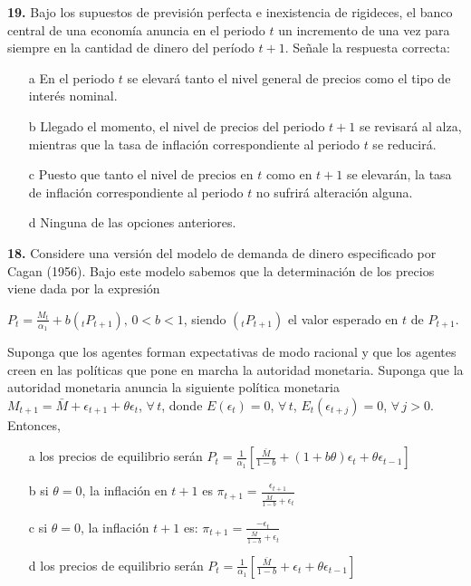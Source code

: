 \documentclass{nuevotema}
\begin{document}
\textbf{19.} Bajo los supuestos de previsión perfecta e inexistencia de rigideces, el banco central de una economía anuncia en el periodo $t$ un incremento de una vez para siempre en la cantidad de dinero del período $t+1$. Señale la respuesta correcta:

\begin{itemize}
	\item[a] En el periodo $t$ se elevará tanto el nivel general de precios como el tipo de interés nominal.
	\item[b] Llegado el momento, el nivel de precios del periodo $t+1$ se revisará al alza, mientras que la tasa de inflación correspondiente al periodo $t$ se reducirá.
	\item[c] Puesto que tanto el nivel de precios en $t$ como en $t+1$ se elevarán, la tasa de inflación correspondiente al periodo $t$ no sufrirá alteración alguna. 
	\item[d] Ninguna de las opciones anteriores.
\end{itemize}


\textbf{18.} Considere una versión del modelo de demanda de dinero especificado por Cagan (1956). Bajo este modelo sabemos que la determinación de los precios viene dada por la expresión

$P_t = \frac{M_t}{\alpha_1} + b( _t P_{t+1} ), \, 0 < b < 1$, siendo $(_t P_{t+1})$ el valor esperado en $t$ de $P_{t+1}$.

Suponga que los agentes forman expectativas de modo racional y que los agentes creen en las políticas que pone en marcha la autoridad monetaria. Suponga que la autoridad monetaria anuncia la siguiente política monetaria $M_{t+1} = \bar{M} + \epsilon_{t+1} + \theta \epsilon_t$, $\forall \, t$, donde $E(\epsilon_t)=0$, $\forall \, t$, $E_t(\epsilon_{t+j}) = 0$, $\forall \, j > 0$. Entonces,

\begin{itemize}
	\item[a] los precios de equilibrio serán $P_t = \frac{1}{\alpha_1} \left[ \frac{\bar{M}}{1-b} + (1+b\theta) \epsilon_t + \theta \epsilon_{t-1} \right]$
	\item[b] si $\theta = 0$, la inflación en $t+1$ es $\pi_{t+1} = \frac{\epsilon_{t+1}}{ \frac{\bar{M}}{1-b} + \epsilon_t}$
	\item[c] si $\theta = 0$, la inflación $t+1$ es: $\pi_{t+1} = \frac{-\epsilon_t}{\frac{\bar{M}}{1-b} + \epsilon_t} $
	\item[d] los precios de equilibrio serán $P_t = \frac{1}{\alpha_1} \left[  \frac{\bar{M}}{1-b} + \epsilon_t + \theta \epsilon_{t-1} \right]$
\end{itemize}
\end{document}
